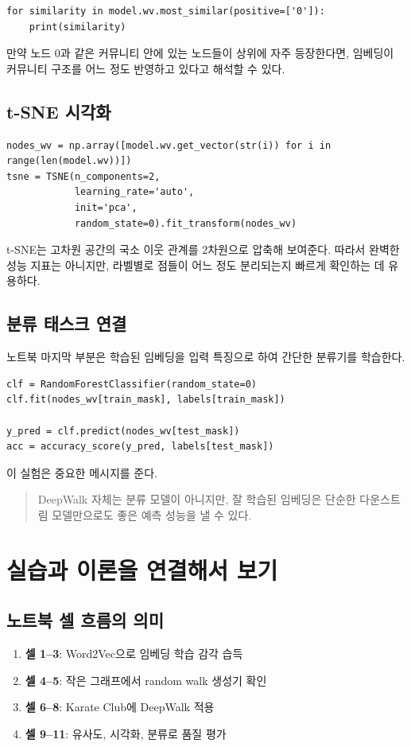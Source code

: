 \documentclass[11pt,a4paper]{article}
\begin{document}
\begin{lstlisting}
for similarity in model.wv.most_similar(positive=['0']):
    print(similarity)
\end{lstlisting}

만약 노드 0과 같은 커뮤니티 안에 있는 노드들이 상위에 자주 등장한다면, 임베딩이 커뮤니티 구조를 어느 정도 반영하고 있다고 해석할 수 있다.

\subsection{t-SNE 시각화}
\begin{lstlisting}
nodes_wv = np.array([model.wv.get_vector(str(i)) for i in range(len(model.wv))])
tsne = TSNE(n_components=2,
            learning_rate='auto',
            init='pca',
            random_state=0).fit_transform(nodes_wv)
\end{lstlisting}

t-SNE는 고차원 공간의 국소 이웃 관계를 2차원으로 압축해 보여준다. 따라서 완벽한 성능 지표는 아니지만, 라벨별로 점들이 어느 정도 분리되는지 빠르게 확인하는 데 유용하다.

\subsection{분류 태스크 연결}
노트북 마지막 부분은 학습된 임베딩을 입력 특징으로 하여 간단한 분류기를 학습한다.

\begin{lstlisting}
clf = RandomForestClassifier(random_state=0)
clf.fit(nodes_wv[train_mask], labels[train_mask])

y_pred = clf.predict(nodes_wv[test_mask])
acc = accuracy_score(y_pred, labels[test_mask])
\end{lstlisting}

이 실험은 중요한 메시지를 준다.
\begin{quote}
DeepWalk 자체는 분류 모델이 아니지만, 잘 학습된 임베딩은 단순한 다운스트림 모델만으로도 좋은 예측 성능을 낼 수 있다.
\end{quote}

\section{실습과 이론을 연결해서 보기}

\subsection{노트북 셀 흐름의 의미}
\begin{enumerate}[leftmargin=*]
  \item \textbf{셀 1--3}: Word2Vec으로 임베딩 학습 감각 습득
  \item \textbf{셀 4--5}: 작은 그래프에서 random walk 생성기 확인
  \item \textbf{셀 6--8}: Karate Club에 DeepWalk 적용
  \item \textbf{셀 9--11}: 유사도, 시각화, 분류로 품질 평가
\end{enumerate}
\end{document}
